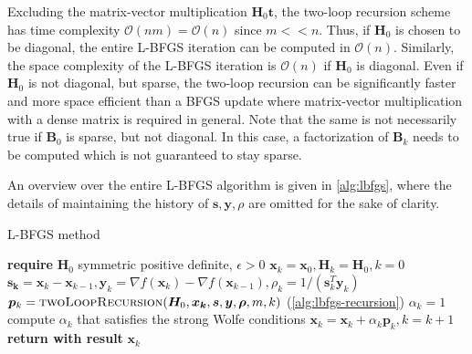 Excluding the matrix-vector multiplication $\bm{H}_0 \bm{t}$, the two-loop recursion scheme has time complexity $\mathcal{O}(nm)
= \mathcal{O}(n)$ since $m << n$. Thus,
if $\bm{H}_0$ is chosen to be diagonal, the entire L-BFGS iteration can be computed in $\mathcal{O}(n)$. Similarly, the space complexity
of the L-BFGS iteration is $\mathcal{O}(n)$ if $\bm{H}_0$ is diagonal. Even if $\bm{H}_0$ is not diagonal, but sparse, the two-loop
recursion can be significantly faster and more space efficient than a BFGS update where matrix-vector multiplication with a dense matrix
is required in general. Note that the same is not necessarily true if $\bm{B}_0$ is sparse, but not diagonal. In this case, a factorization
of $\bm{B}_k$ needs to be computed which is not guaranteed to stay sparse.

An overview over the entire L-BFGS algorithm is given in \cref{alg:lbfgs}, where the details of maintaining the history
of $\bm{s}, \bm{y}, \rho$ are omitted for the sake of clarity.

\begin{algorithm}
\caption{L-BFGS method}\label{alg:lbfgs}
\begin{algorithmic}
\State \textbf{require } $\bm{H}_0$ symmetric positive definite, $\epsilon > 0$
\State $\bm{x}_k = \bm{x}_0, \bm{H}_k = \bm{H}_0, k=0$
\State $\bm{s_k} = \bm{x}_k - \bm{x}_{k-1}, \bm{y}_k = \nabla f(\bm{x}_k) - \nabla f(\bm{x}_{k-1}), \rho_k = 1 / (\bm{s}^T_k \bm{y}_k)$
\State $\bm{p}_k = \text{\textsc{twoLoopRecursion}}(\bm{H}_0, \bm{x_k}, \bm{s}, \bm{y}, \bm{\rho}, m, k)$   (\cref{alg:lbfgs-recursion})
\State $\alpha_k = 1$
\State compute $\alpha_k$ that satisfies the strong Wolfe conditions
\EndIf
\State $\bm{x}_k = \bm{x}_k + \alpha_k \bm{p}_k, k = k + 1$
\EndWhile
\State \textbf{return with result } $\bm{x}_k$
\EndProcedure
\end{algorithmic}
\end{algorithm}

